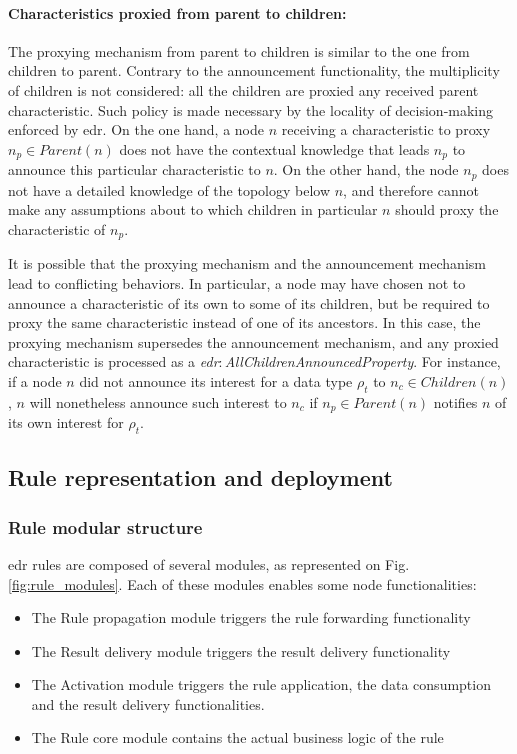 \documentclass{iosart2c}
\newcommand{\namespace}[1]{\textit{#1$:$}}
\newcommand{\concept}[2]{\namespace{#1}\-\textit{#2}}
\begin{document}
\paragraph{Characteristics proxied from parent to children:}
The proxying mechanism from parent to children is similar to the one from children to parent.
Contrary to the announcement functionality, the multiplicity of children is not considered: all the children are proxied any received parent characteristic.
Such policy is made necessary by the locality of decision-making enforced by \gls{edr}. 
On the one hand, a node $n$ receiving a characteristic to proxy $n_{p}\in Parent(n)$ does not have the contextual knowledge that leads $n_{p}$ to announce this particular characteristic to $n$.
On the other hand, the node $n_{p}$ does not have a detailed knowledge of the topology below $n$, and therefore cannot make any assumptions about to which children in particular $n$ should proxy the characteristic of $n_{p}$.

It is possible that the proxying mechanism and the announcement mechanism lead to conflicting behaviors.
In particular, a node may have chosen not to announce a characteristic of its own to some of its children, but be required to proxy the same characteristic instead of one of its ancestors.
In this case, the proxying mechanism supersedes the announcement mechanism, and any proxied characteristic is processed as a \concept{edr}{All\-Children\-Announced\-Property}.
For instance, if a node $n$ did not announce its interest for a data type $\rho_t$ to $n_{c}\in Children(n)$, $n$ will nonetheless announce such interest to $n_{c}$ if $n_{p}\in Parent(n)$ notifies $n$ of its own interest for $\rho_t$.

\subsection{Rule representation and deployment}
\label{subs:edr_rules}

\subsubsection{Rule modular structure}

\gls{edr} rules are composed of several modules, as represented on Fig. \ref{fig:rule_modules}. 
Each of these modules enables some node functionalities:

\begin{itemize}
	\item The Rule propagation module triggers the rule forwarding functionality
	\item The Result delivery module triggers the result delivery functionality
	\item The Activation module triggers the rule application, the data consumption and the result delivery functionalities.
	\item The Rule core module contains the actual business logic of the rule
\end{itemize}
\end{document}

